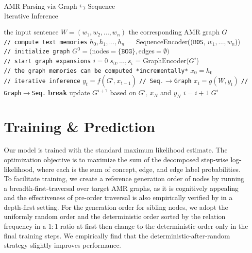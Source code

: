 \documentclass[11pt,a4paper]{article}
\begin{document}
	\begin{algorithm}[t]
		\caption{AMR Parsing via Graph{\small $\leftrightarrows$}Sequence\\ Iterative Inference }
		\begin{algorithmic}[1]
			\REQUIRE the input sentence $W=(w_1, w_2, \ldots, w_n)$
			\ENSURE the corresponding AMR graph $G$ \\
			\texttt{// compute text memories}
			\STATE $h_0, h_1, \ldots, h_n = $ SequenceEncoder((\texttt{BOS}, $w_1, \ldots, w_n$))\\
			\texttt{// initialize graph}
			\STATE $G^0=($nodes$=\{\texttt{BOG}\}, $edges$=\emptyset)$\\
			\texttt{// start graph expansions}
			\STATE $i=0$
			\STATE $s_0, \ldots, s_{i}$ = GraphEncoder($G^i$) \\
			\texttt{// the graph memories can be computed *incrementally*}
			\STATE $x_0=h_0$\\
			\texttt{// iterative inference}
			\STATE $y_t=f(G^i, x_{t-1})$ \texttt{// Seq.$\rightarrow$Graph}
			\STATE $x_t=g(W, y_t)$ \texttt{// Graph$\rightarrow$Seq.}
			\ENDFOR
			\STATE \textbf{break}
			\ENDIF
			\STATE update $G^{i+1}$ based on $G^{i}$, $x_N$ and $y_N$
			\STATE $i=i+1$
			\ENDWHILE
			\RETURN $G^i$
		\end{algorithmic}
		\label{algo}
	\end{algorithm}
	\section{Training \& Prediction}
	Our model is trained with the standard maximum likelihood estimate. The optimization objective is to maximize the sum of the decomposed step-wise log-likelihood, where each is the sum of concept, edge, and edge label probabilities. To facilitate training, we create a reference generation order of nodes by running a breadth-first-traversal over target AMR graphs, as it is cognitively appealing \cite[core-semantic-first principle,][]{cai-lam-2019-core} and the effectiveness of pre-order traversal is also empirically verified by  in a depth-first setting. For the generation order for sibling nodes, we adopt the uniformly random order and the deterministic order sorted by the relation frequency in a $1:1$ ratio at first then change to the deterministic order only in the final training steps. We empirically find that the deterministic-after-random strategy slightly improves performance.
	
\end{document}
